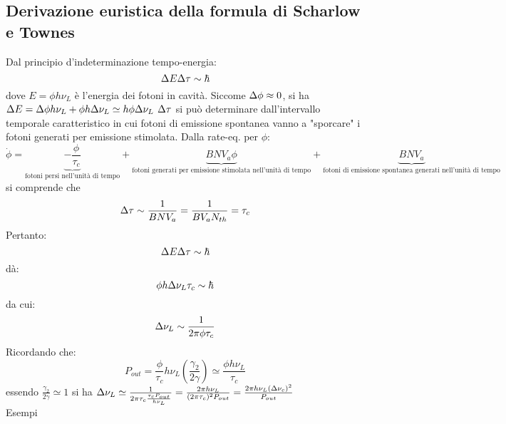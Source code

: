 \subsection{Derivazione euristica della formula di Scharlow e Townes}
Dal principio d'indeterminazione tempo-energia:
\begin{equation*}
\Delta E \Delta \tau \sim \hbar
\end{equation*}
dove $E = \phi h \nu_L$ è l'energia dei fotoni in cavità. Siccome $\Delta \phi \approx 0$, si ha $\Delta E = \Delta \phi h \nu_L + \phi h \Delta\nu_L \simeq h\phi\Delta \nu_L$
$\Delta \tau$ si può determinare dall'intervallo temporale caratteristico in cui fotoni di emissione spontanea vanno a "sporcare" i fotoni generati per emissione stimolata.
Dalla rate-eq. per $\phi$:
\begin{equation*}
\dot{\phi} = \underbrace{-\frac{\phi}{\tau_c}}_\text{fotoni persi nell'unità di tempo} + \underbrace{BNV_a\phi}_\text{fotoni generati per emissione stimolata nell'unità di tempo} + \underbrace{BNV_a}_\text{fotoni di emissione spontanea generati nell'unità di tempo}
\end{equation*}
si comprende che
\begin{equation*}
\Delta\tau \sim \frac{1}{BNV_a} = \frac{1}{BV_aN_{th}} = \tau_c
\end{equation*}
Pertanto:
\begin{equation*}
\Delta E \Delta \tau \sim \hbar
\end{equation*}
dà:
\begin{equation*}
\phi h \Delta\nu_L \tau_c \sim \hbar
\end{equation*}
da cui:
\begin{equation*}
\Delta\nu_L \sim \frac{1}{2\pi \phi \tau_c}
\end{equation*}
Ricordando che:
\begin{equation*}
P_{out} = \frac{\phi}{\tau_c} h\nu_L \left(\frac{\gamma_2}{2\gamma}\right) \simeq \frac{\phi h \nu_L}{\tau_c}
\end{equation*}
essendo $\frac{\gamma_2}{2\gamma} \simeq 1$ si ha $\Delta\nu_L \simeq \frac{1}{2\pi \tau_c \frac{\tau_c P_{out}}{h\nu_L}} = \frac{2\pi h\nu_L}{(2\pi\tau_c)^2 P_{out}} = \frac{2\pi h\nu_L (\Delta \nu_c)^2}{P_{out}}$
\\
Esempi
